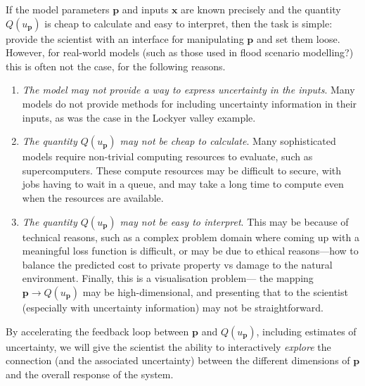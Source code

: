 \documentclass[a4paper,fontsize=12pt]{scrartcl}
\begin{document}
If the model parameters $\mathbf{p}$ and inputs $\mathbf{x}$ are known
precisely and the quantity $Q(u_{\mathbf{p}})$ is cheap to calculate
and easy to interpret, then the task is simple: provide the scientist
with an interface for manipulating $\mathbf{p}$ and set them loose.
However, for real-world models (such as those used in flood scenario
modelling?) this is often not the case, for the following reasons.
\begin{enumerate}
\item \emph{The model may not provide a way to express uncertainty in
    the inputs}. Many models do not provide methods for including
  uncertainty information in their inputs, as was the case in the
  Lockyer valley example.
\item \emph{The quantity $Q(u_{\mathbf{p}})$ may not be cheap to
    calculate}. Many sophisticated models require non-trivial
  computing resources to evaluate, such as supercomputers. These
  compute resources may be difficult to secure, with jobs having to
  wait in a queue, and may take a long time to compute even when the
  resources are available.
\item \emph{The quantity $Q(u_{\mathbf{p}})$ may not be easy to
    interpret}. This may be because of technical reasons, such as a
  complex problem domain where coming up with a meaningful loss
  function is difficult, or may be due to ethical reasons---how to
  balance the predicted cost to private property vs damage to the
  natural environment. Finally, this is a visualisation problem---
  the mapping $\mathbf{p} \rightarrow Q(u_{\mathbf{p}})$ may be high-dimensional,
  and presenting that to the scientist (especially with uncertainty
  information) may not be straightforward.
\end{enumerate}
By accelerating the feedback loop between $\mathbf{p}$ and
$Q(u_{\mathbf{p}})$, including estimates of uncertainty, we will give
the scientist the ability to interactively \emph{explore} the
connection (and the associated uncertainty) between the different
dimensions of $\mathbf{p}$ and the overall response of the
system.
\end{document}
